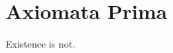 ﻿\section{Axiomata Prima}
\label{sec:bk1_axiomata_prima}
\begin{axiom}
\label{axiom:bk1_axiomata_prima}
Existence is not.
\end{axiom}
